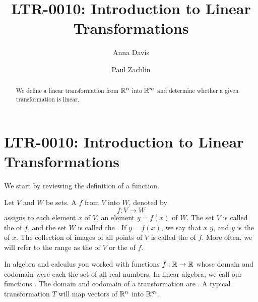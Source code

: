 \documentclass{ximera}
\author{Anna Davis \and Paul Zachlin} \title{LTR-0010: Introduction to Linear Transformations} \license{CC-BY 4.0}
\begin{document}
\begin{abstract}
  We define a linear transformation from $\mathbb{R}^n$ into $\mathbb{R}^m$ and determine whether a given transformation is linear.
\end{abstract}
\maketitle


\section*{LTR-0010: Introduction to Linear Transformations}

We start by reviewing the definition of a function.

\begin{definition} \label{def:function}
  
Let $V$ and $W$ be sets.  A  $f$ from $V$ into $W$, denoted by 
$$f:V\rightarrow W$$
assigns to each element $x$ of $V$, an element $y=f(x)$ of $W$. 
\vskip 10pt
The set $V$ is called the  of $f$, and the set $W$ is called the .
\vskip 10pt
If $y=f(x)$, we say that $x$  $y$, and $y$ is the  of $x$.
\vskip 10pt
The collection of images of all points of $V$ is called the  of $f$.  More often, we will refer to the range as the  of $V$ or the  of $f$.
  
\end{definition}


In algebra and calculus you worked with functions $f:\mathbb{R}\rightarrow\mathbb{R}$ whose domain and codomain were each the set of all real numbers.  In linear algebra, we call our functions .  The domain and codomain of a transformation are .  A typical transformation $T$ will map vectors of $\mathbb{R}^n$ into $\mathbb{R}^m$.
\end{document}
